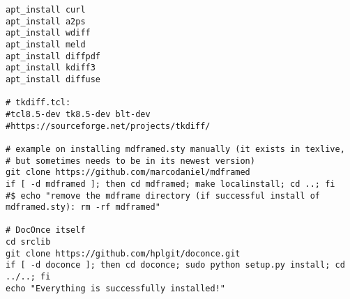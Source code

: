 \documentclass[%
oneside,                 %
final,                   %
chapterprefix=true,      %
open=right,              %
10pt]{book}
\newcommand{\clearemptydoublepage}{\clearpage{\pagestyle{empty}\cleardoublepage}}
\begin{document}
\begin{verbatim}
apt_install curl
apt_install a2ps
apt_install wdiff
apt_install meld
apt_install diffpdf
apt_install kdiff3
apt_install diffuse

# tkdiff.tcl:
#tcl8.5-dev tk8.5-dev blt-dev
#https://sourceforge.net/projects/tkdiff/

# example on installing mdframed.sty manually (it exists in texlive,
# but sometimes needs to be in its newest version)
git clone https://github.com/marcodaniel/mdframed
if [ -d mdframed ]; then cd mdframed; make localinstall; cd ..; fi
#$ echo "remove the mdframe directory (if successful install of mdframed.sty): rm -rf mdframed"

# DocOnce itself
cd srclib
git clone https://github.com/hplgit/doconce.git
if [ -d doconce ]; then cd doconce; sudo python setup.py install; cd ../..; fi
echo "Everything is successfully installed!"
\end{verbatim}



\clearemptydoublepage
{}
\thispagestyle{empty}
\printindex
\end{document}
